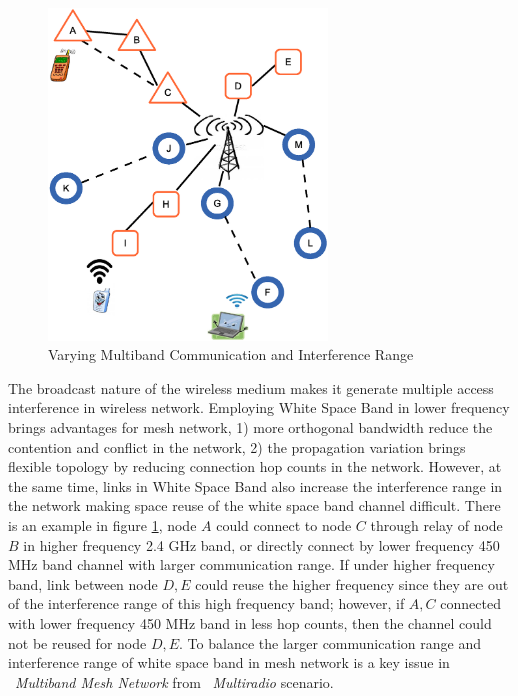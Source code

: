 \begin{figure}                                                                                                                     
\centering
\includegraphics[width=74mm]{figures/interferencerange}
\vspace{-0.1in}
\caption{Varying Multiband Communication and Interference Range}
\label{fig:interferencerange}
\end{figure}


The broadcast nature of the wireless medium makes it generate multiple access interference in wireless network.
Employing White Space Band in lower frequency brings advantages for mesh network, 1) more orthogonal bandwidth reduce the contention and conflict in the network,
 2) the propagation variation brings flexible topology by reducing connection hop counts in the network.
However, at the same time, links in White Space Band also increase the interference range in the network making space reuse of the white space band channel difficult. 
There is an example in figure \ref{fig:interferencerange}, node $A$  could connect to node $C$ through relay of node $B$ in higher frequency 2.4 GHz band, or directly connect by lower frequency 450 MHz band channel with larger communication range.
If under higher frequency band, link between node $D,E$ could reuse the higher frequency since they are out of the interference range of this high frequency band; 
however, if $A,C$ connected with lower frequency 450 MHz band in less hop counts, then the channel could not be reused for node $D,E$.
To balance the larger communication range and interference range of white space band in mesh network is a key issue in ~\emph{Multiband Mesh Network} from ~\emph{Multiradio} scenario.

